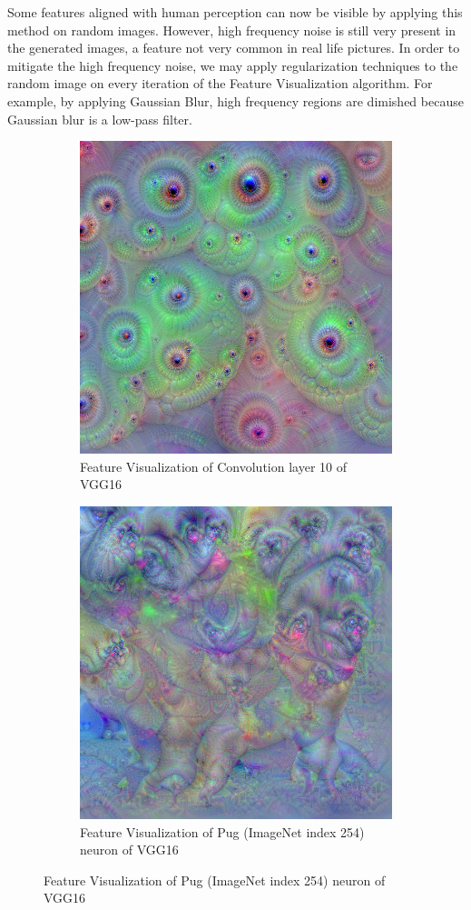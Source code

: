 Some features aligned with human perception can now be visible by applying this method on random images. 
However, high frequency noise is still very present in the generated images, a feature not very common in real life pictures.
In order to mitigate the high frequency noise, we may apply regularization techniques to the random image on every iteration of the Feature Visualization algorithm.
For example, by applying Gaussian Blur, high frequency regions are dimished because Gaussian blur is a low-pass filter.

\begin{figure}
    \captionsetup{justification=centering}

    \begin{subfigure}[t]{0.45\textwidth}
        \captionsetup{justification=centering}
        \centering
        \includegraphics[width=.7\linewidth]{figuras/feat_vis/random_image_dream_reg.png}
        \caption{Feature Visualization of Convolution layer 10 of VGG16}
        \label{fig:feat_conv_L22_reg}
    \end{subfigure}
    \hfill
    \begin{subfigure}[t]{0.45\textwidth}
        \captionsetup{justification=centering}
        \centering
        \includegraphics[width=.7\linewidth]{figuras/feat_vis/random_image_dream_pug_254_reg.png}
        \caption{Feature Visualization of Pug (ImageNet index 254) neuron of VGG16}
        \label{fig:feat_conv_I254_reg}
    \end{subfigure}


\end{figure}
